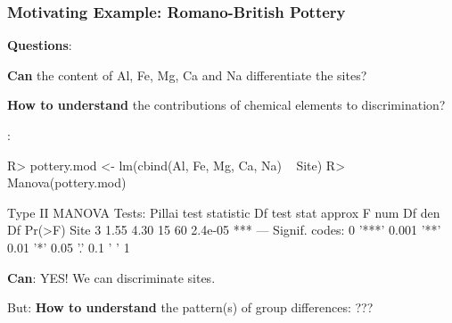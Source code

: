 \begin{frame}[containsverbatim]
	\frametitle{Motivating Example: Romano-British Pottery}
 \begin{block}{\textbf{Questions}:}
	\begin{itemize*}
	  \item \textbf{Can} the content of Al, Fe, Mg, Ca and Na  
	differentiate the sites?
	  \item \textbf{How to understand} the contributions of chemical elements
	  to discrimination?
	\end{itemize*}
\end{block}

:
\begin{CodeInput}
R> pottery.mod <- lm(cbind(Al, Fe, Mg, Ca, Na) ~ Site)
R> Manova(pottery.mod)
\end{CodeInput}
\begin{CodeOutput}
Type II MANOVA Tests: Pillai test statistic
     Df test stat approx F num Df den Df  Pr(>F)    
Site  3      1.55     4.30     15     60 2.4e-05 ***
---
Signif. codes:  0 '***' 0.001 '**' 0.01 '*' 0.05 '.' 0.1 ' ' 1 
\end{CodeOutput} 

	\begin{itemize*}
		\item \textbf{Can}: YES! We can discriminate sites.
		\item But: \textbf{How to understand} the pattern(s) of group differences: ???
	\end{itemize*}
\end{frame}

